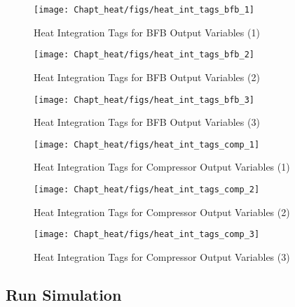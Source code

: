 \begin{figure}[H]
	\begin{center}
		\texttt{[image: Chapt\_heat/figs/heat\_int\_tags\_bfb\_1]}
		\caption{Heat Integration Tags for BFB Output Variables (1)}
		\label{heat.int.tags.bfb.1}
	\end{center}
\end{figure}

\begin{figure}[H]
	\begin{center}
		\texttt{[image: Chapt\_heat/figs/heat\_int\_tags\_bfb\_2]}
		\caption{Heat Integration Tags for BFB Output Variables (2)}
		\label{heat.int.tags.bfb.2}
	\end{center}
\end{figure}

\begin{figure}[H]
	\begin{center}
		\texttt{[image: Chapt\_heat/figs/heat\_int\_tags\_bfb\_3]}
		\caption{Heat Integration Tags for BFB Output Variables (3)}
		\label{heat.int.tags.bfb.3}
	\end{center}
\end{figure}

\begin{figure}[H]
	\begin{center}
		\texttt{[image: Chapt\_heat/figs/heat\_int\_tags\_comp\_1]}
		\caption{Heat Integration Tags for Compressor Output Variables (1)}
		\label{heat.int.tags.comp.1}
	\end{center}
\end{figure}

\begin{figure}[H]
	\begin{center}
		\texttt{[image: Chapt\_heat/figs/heat\_int\_tags\_comp\_2]}
		\caption{Heat Integration Tags for Compressor Output Variables (2)}
		\label{heat.int.tags.comp.2}
	\end{center}
\end{figure}

\begin{figure}[H]
	\begin{center}
		\texttt{[image: Chapt\_heat/figs/heat\_int\_tags\_comp\_3]}
		\caption{Heat Integration Tags for Compressor Output Variables (3)}
		\label{heat.int.tags.comp.3}
	\end{center}
\end{figure}


\subsection{Run Simulation}

